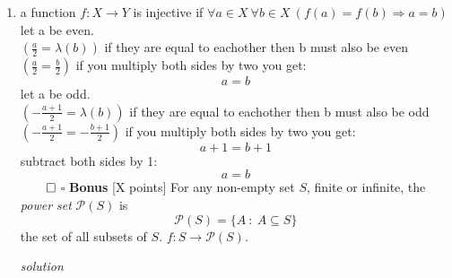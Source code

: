 \documentclass[11pt,twoside]{amsart}
\begin{document}
\begin{enumerate}[1)]
    
    \bigskip
  \item
a function $f: X \rightarrow Y$ is injective if 
$\forall a \in X \ \forall b \in X \ (f(a) = f(b) \Rightarrow a=b)$ \\
let a be even. \\
$(\frac{a}{2} = \lambda(b))$ if they are equal to eachother then b must also be even \\
$(\frac{a}{2} = \frac{b}{2})$ if you multiply both sides by two you get:
$$a = b$$
let a be odd. \\
$(-\frac{a+1}{2} = \lambda(b))$ if they are equal to eachother then b must also be odd \\
$(-\frac{a+1}{2} = -\frac{b+1}{2})$ if you multiply both sides by two you get:
$$a+1 = b+1$$
subtract both sides by 1:
$$a = b$$
$\qed$
    \bigskip
\newpage
\noindent $\square$ \textbf{Bonus} [X points] For any non-empty set $S$, finite or infinite, the \textit{power set} $\mathcal{P}(S)$ is 
$$\mathcal{P}(S) = \{ A \ : \ A \subseteq S \}$$ 
the set of all subsets of $S$. $f: S \rightarrow \mathcal{P}(S)$. 


\emph{solution}


\end{enumerate}
	
\end{document}
